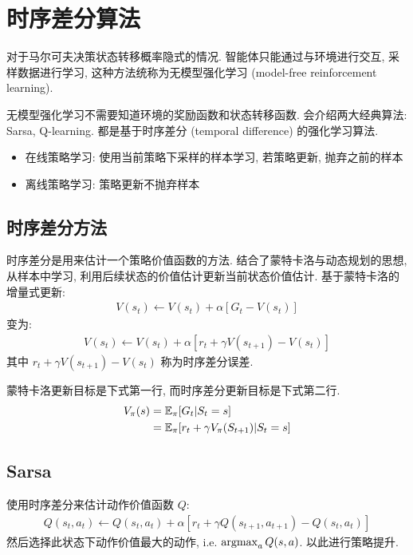 \newpage
\section{时序差分算法}

对于马尔可夫决策状态转移概率隐式的情况. 智能体只能通过与环境进行交互, 采样数据进行学习, 这种方法统称为无模型强化学习 (model-free reinforcement learning).

无模型强化学习不需要知道环境的奖励函数和状态转移函数. 会介绍两大经典算法: Sarsa, Q-learning. 都是基于时序差分 (temporal difference) 的强化学习算法. 

\begin{itemize}
    \item 在线策略学习: 使用当前策略下采样的样本学习, 若策略更新, 抛弃之前的样本
    \item 离线策略学习: 策略更新不抛弃样本
\end{itemize}

\subsection{时序差分方法}
时序差分是用来估计一个策略价值函数的方法. 结合了蒙特卡洛与动态规划的思想, 从样本中学习, 利用后续状态的价值估计更新当前状态价值估计. 基于蒙特卡洛的增量式更新:
\begin{align*}
    V(s_t)\leftarrow V(s_t) + \alpha [G_t - V(s_t)]
\end{align*}
变为:
\begin{align*}
    V(s_t)\leftarrow V(s_t) + \alpha \left[r_t + \gamma V(s_{t+1})-V(s_t)\right]
\end{align*}
其中 $r_t + \gamma V(s_{t+1})-V(s_t)$ 称为时序差分误差. 

蒙特卡洛更新目标是下式第一行, 而时序差分更新目标是下式第二行.
\begin{align*}
    V_\pi(s)&=\mathbb{E}_\pi [G_t|S_t=s]\\
    &=\mathbb{E}_\pi[r_t + \gamma V_\pi(S_{t+1})| S_t = s]
\end{align*}

\subsection{Sarsa}
使用时序差分来估计动作价值函数 $Q$:
\begin{align*}
    Q(s_t, a_t) \leftarrow Q(s_t, a_t) + \alpha \left[ r_t + \gamma Q(s_{t+1}, a_{t+1}) - Q(s_t, a_t) \right]
\end{align*}
然后选择此状态下动作价值最大的动作, i.e. $\operatorname*{argmax}_a Q(s, a)$. 以此进行策略提升.

